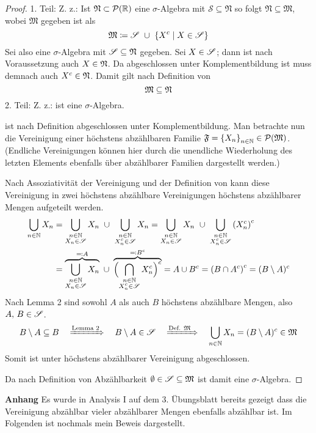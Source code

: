 \documentclass{anablatt}
\begin{document}
\begin{proof}
1. Teil: Z. z.: Ist $\mathfrak{N} \subset \mathcal{P}(\R)$ eine $\sigma$-Algebra mit $\mathscr{S} \subseteq \mathfrak{N}$ so folgt $\mathfrak{N} \subseteq \mathfrak{M}$, wobei $\mathfrak{M}$ gegeben ist als
\[ \frM \coloneqq \S ~\cup~ \qty{X^c \mid X \in \S} \]
Sei also eine $\sigma$-Algebra \frN mit $\S \subseteq \frN$ gegeben. Sei $X \in \S$; dann ist nach Voraussetzung auch $X \in \frN$. Da \frN abgeschlossen unter Komplementbildung ist muss demnach auch $X^c \in \frN$. Damit gilt nach Definition von \frM
\[ \frM \subseteq \frN \]
2. Teil: Z. z.: \frM ist eine $\sigma$-Algebra.

\frM ist nach Definition abgeschlossen unter Komplementbildung. Man betrachte nun die Vereinigung einer höchstens abzählbaren Familie $\mathfrak{F} = \qty{X_n}_{n \in \N} \in \mathcal{P}(\frM)$. (Endliche Vereinigungen können hier durch die unendliche Wiederholung des letzten Elements ebenfalls über abzählbarer Familien dargestellt werden.)

Nach Assoziativität der Vereinigung und der Definition von \frM kann diese Vereinigung in zwei höchstens abzählbare Vereinigungen höchstens abzählbarer Mengen aufgeteilt werden.
\begin{align*}
    \bigcup_{n \in \N} X_n &= \bigcup_{\substack{n \in \N\\X_n \in \S}}X_n ~\cup~ \bigcup_{\substack{n \in \N\\X_n^c \in \S}}X_n
    = \bigcup_{\substack{n \in \N\\X_n \in \S}}X_n ~\cup~ \bigcup_{\substack{n \in \N\\X_n^c \in \S}}\qty(X_n^c)^c \\
    &= \overbrace{\bigcup_{\substack{n \in \N\\X_n \in \S}}X_n}^{\eqqcolon A} ~\cup~ \overbrace{\qty\Big(\bigcap_{\substack{n \in \N\\X_n^c \in \S}}X_n^c)^c}^{\eqqcolon B^c}
    = A \cup B^c = \qty(B \cap A^c)^c = (B \setminus A)^c
\end{align*}
Nach Lemma 2 sind sowohl $A$ als auch $B$ höchstens abzählbare Mengen, also $A,\,B \in \S$.
\[
    B \setminus A \subseteq B \quad \xRightarrow{\text{Lemma 2}} \quad B \setminus A \in \S
    \quad \xRightarrow{\text{Def. \frM}} \quad \bigcup_{n \in \N} X_n = (B \setminus A)^c \in \frM
\]
Somit ist \frM unter höchstens abzählbarer Vereinigung abgeschlossen.

Da nach Definition von Abzählbarkeit $\emptyset \in \S \subseteq \frM$ ist \frM damit eine $\sigma$-Algebra.
\end{proof}
\newpage
\textbf{Anhang} \quad Es wurde in Analysis I auf dem 3. Übungsblatt bereits gezeigt dass die Vereinigung abzählbar vieler abzählbarer Mengen ebenfalls abzählbar ist. Im Folgenden ist nochmals mein Beweis dargestellt. \\
\end{document}
